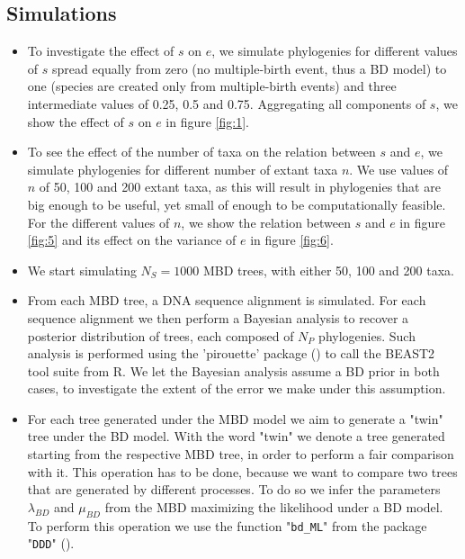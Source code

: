 \documentclass{article}
\begin{document}
\subsection{Simulations}
\begin{itemize}

\item To investigate the effect of $s$ on $e$, we simulate phylogenies
for different values of $s$ spread equally from zero (no multiple-birth
event, thus a BD model) to one (species are created only from multiple-birth
events) and three intermediate values of 0.25, 0.5 and 0.75. Aggregating all
components of $s$, we show the effect of $s$ on $e$ in figure \ref{fig:1}.

\item To see the effect of the number of taxa on the relation 
between $s$ and $e$, we simulate phylogenies
for different number of extant taxa $n$. We use values of $n$
of 50, 100 and 200 extant taxa, as this will result in phylogenies
that are big enough to be useful, yet small of enough to
be computationally feasible. For the different values of $n$, we show
the relation between $s$ and $e$ in figure \ref{fig:5} and its effect
on the variance of $e$ in figure \ref{fig:6}.

\item We start simulating $N_{S} = 1000$ MBD trees,
with either 50, 100 and 200 taxa.

\item From each MBD tree, a DNA sequence alignment is simulated. 
For each sequence alignment we then perform a Bayesian analysis 
to recover a posterior distribution of trees, 
each composed of $N_{P}$ phylogenies. 
Such analysis is performed using 
the 'pirouette' package (\cite{pirouette}) to call the BEAST2 tool 
suite from R. 
We let the Bayesian analysis assume a BD prior in both cases, 
to investigate the extent of the error we make under this assumption.

\item For each tree generated under the MBD model 
we aim to generate a "twin" tree under the BD model. 
With the word "twin" 
we denote a tree generated starting from the respective MBD tree, 
in order to perform a fair comparison with it. 
This operation has to be done, 
because we want to compare two trees 
that are generated by different processes. 
To do so we infer the parameters $\lambda_{BD}$ and $\mu_{BD}$ 
from the MBD maximizing the likelihood under a BD model. 
To perform this operation we use the function "\texttt{bd\_ML}" 
from the package "\texttt{DDD}" (\cite{etienne2012diversity}). 


\end{itemize}
\end{document}
